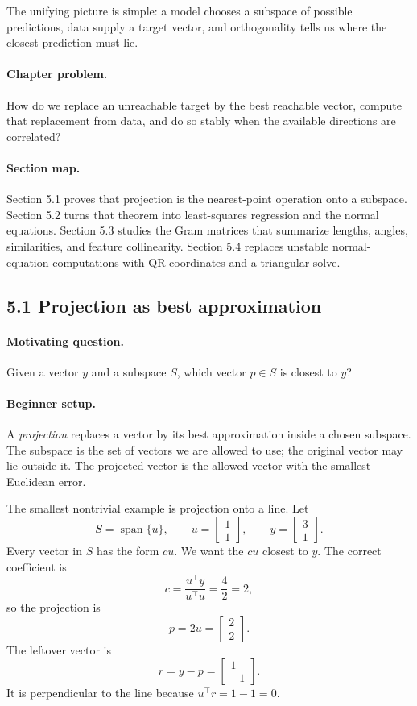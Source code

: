 The unifying picture is simple: a model chooses a subspace of possible predictions, data supply a target vector, and orthogonality tells us where the closest prediction must lie.

\paragraph{Chapter problem.}
How do we replace an unreachable target by the best reachable vector, compute that replacement from data, and do so stably when the available directions are correlated?

\paragraph{Section map.}
Section 5.1 proves that projection is the nearest-point operation onto a subspace. Section 5.2 turns that theorem into least-squares regression and the normal equations. Section 5.3 studies the Gram matrices that summarize lengths, angles, similarities, and feature collinearity. Section 5.4 replaces unstable normal-equation computations with QR coordinates and a triangular solve.

\subsection{5.1 Projection as best approximation}

\paragraph{Motivating question.}
Given a vector \(y\) and a subspace \(S\), which vector \(p\in S\) is closest to \(y\)?

\paragraph{Beginner setup.}
A \emph{projection} replaces a vector by its best approximation inside a chosen subspace. The subspace is the set of vectors we are allowed to use; the original vector may lie outside it. The projected vector is the allowed vector with the smallest Euclidean error.

The smallest nontrivial example is projection onto a line. Let
\[
S=\operatorname{span}\{u\},
\qquad
u=\begin{bmatrix}1\\1\end{bmatrix},
\qquad
y=\begin{bmatrix}3\\1\end{bmatrix}.
\]
Every vector in \(S\) has the form \(cu\). We want the \(cu\) closest to \(y\). The correct coefficient is
\[
c=\frac{u^\top y}{u^\top u}
=\frac{4}{2}=2,
\]
so the projection is
\[
p=2u=\begin{bmatrix}2\\2\end{bmatrix}.
\]
The leftover vector is
\[
r=y-p=\begin{bmatrix}1\\-1\end{bmatrix}.
\]
It is perpendicular to the line because \(u^\top r=1-1=0\).

